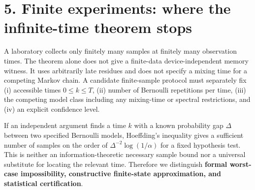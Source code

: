\documentclass[11pt,a4paper,oneside]{book}
\begin{document}
\section*{5. Finite experiments: where the infinite-time theorem stops}
A laboratory collects only finitely many samples at finitely many observation times. The theorem alone does not give a finite-data device-independent memory witness. It uses arbitrarily late residues and does not specify a mixing time for a competing Markov chain. A candidate finite-sample protocol must separately fix (i) accessible times $0\le k\le T$, (ii) number of Bernoulli repetitions per time, (iii) the competing model class including any mixing-time or spectral restrictions, and (iv) an explicit confidence level.

If an independent argument finds a time $k$ with a known probability gap $\Delta$ between two specified Bernoulli models, Hoeffding's inequality gives a sufficient number of samples on the order of $\Delta^{-2}\log(1/\alpha)$ for a fixed hypothesis test. This is neither an information-theoretic necessary sample bound nor a universal substitute for locating the relevant time. Therefore we distinguish \textbf{formal worst-case impossibility, constructive finite-state approximation, and statistical certification}.
\end{document}
